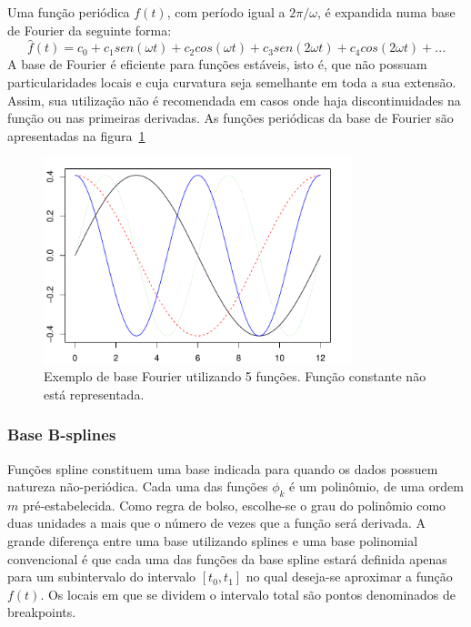 \documentclass[
	12pt,				%
	openright,			%
	oneside,			%
	a4paper,			%
	english,			%
	brazil				%
	]{dissertacao-ufrgs-abntex2}
\begin{document}
Uma função periódica $f(t)$, com período igual a $2\pi/\omega$,
é expandida numa base de Fourier da seguinte forma:
\begin{equation}
\hat{f}(t)=c_{0}+c_{1}sen(\omega t)+c_{2}cos(\omega t)+c_{3}sen(2\omega t)+c_{4}cos(2\omega t)+...
\end{equation}
A base de Fourier é eficiente para funções estáveis, isto é, que não
possuam particularidades locais e cuja curvatura seja semelhante em
toda a sua extensão. Assim, sua utilização não é recomendada em casos
onde haja discontinuidades na função ou nas primeiras derivadas. As funções periódicas da base de Fourier são apresentadas na figura~\ref{fig-base-fourier}
\begin{figure}[h!] \label{fig-base-fourier}
  \centering
    \includegraphics[width=0.8\textwidth]{anexos/base_fourier}
  \caption{Exemplo de base Fourier utilizando 5 funções. Função constante não está representada.}
\end{figure}

\subsubsection*{Base B-splines} \label{sub:Base-B-splines}

Funções spline constituem uma base indicada para quando os dados possuem natureza não-periódica. 
Cada uma das funções $\phi_k$ é um polinômio, de uma ordem $m$ pré-estabelecida. 
Como regra de bolso, escolhe-se o grau do polinômio como duas unidades a mais que o número de vezes que a função será derivada.
A grande diferença entre uma base utilizando splines e uma base polinomial convencional é que cada uma das funções da base spline estará definida apenas para um subintervalo do intervalo $[t_0,t_1]$ no qual  deseja-se aproximar a função $f(t)$.
Os locais em que se dividem o intervalo total são pontos denominados de breakpoints.
\end{document}
